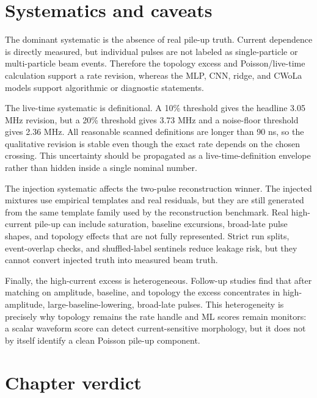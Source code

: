 \section{Systematics and caveats}
\label{sec:pileup_systematics}

The dominant systematic is the absence of real pile-up truth.  Current
dependence is directly measured, but individual pulses are not labeled as
single-particle or multi-particle beam events.  Therefore the topology excess
and Poisson/live-time calculation support a rate revision, whereas the MLP,
CNN, ridge, and CWoLa models support algorithmic or diagnostic statements.

The live-time systematic is definitional.  A 10\% threshold gives the
headline 3.05 MHz revision, but a 20\% threshold gives 3.73 MHz and a
noise-floor threshold gives 2.36 MHz.  All reasonable scanned definitions are
longer than 90 ns, so the qualitative revision is stable even though the exact
rate depends on the chosen crossing.  This uncertainty should be propagated as
a live-time-definition envelope rather than hidden inside a single nominal
number.

The injection systematic affects the two-pulse reconstruction winner.  The
injected mixtures use empirical templates and real residuals, but they are
still generated from the same template family used by the reconstruction
benchmark.  Real high-current pile-up can include saturation, baseline
excursions, broad-late pulse shapes, and topology effects that are not fully
represented.  Strict run splits, event-overlap checks, and shuffled-label
sentinels reduce leakage risk, but they cannot convert injected truth into
measured beam truth.

Finally, the high-current excess is heterogeneous.  Follow-up studies find
that after matching on amplitude, baseline, and topology the excess
concentrates in high-amplitude, large-baseline-lowering, broad-late pulses.
This heterogeneity is precisely why topology remains the rate handle and ML
scores remain monitors: a scalar waveform score can detect current-sensitive
morphology, but it does not by itself identify a clean Poisson pile-up
component.

\section{Chapter verdict}
\label{sec:pileup_verdict}

